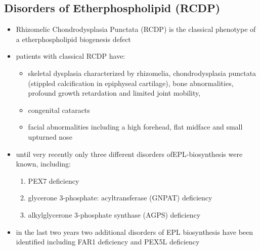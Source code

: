 \documentclass{scrartcl}
\begin{document}
\subsection{Disorders of Etherphospholipid (RCDP)}
\label{sec:orgdab7c38}
\begin{itemize}
\item Rhizomelic Chondrodysplasia Punctata (RCDP) is the classical
phenotype of a etherphospholipid biogenesis defect

\item patients with classical RCDP have:
\begin{itemize}
\item skeletal dysplasia characterized by rhizomelia, chondrodysplasia punctata (stippled calcification in epiphyseal cartilage), bone abnormalities, profound growth retardation and limited joint mobility,
\item congenital cataracts
\item facial abnormalities including a high forehead, flat midface and small upturned nose
\end{itemize}
\item until very recently only three different disorders ofEPL-biosynthesis were known, including:
\begin{enumerate}
\item PEX7 deficiency
\item glycerone 3-phosphate: acyltransferase (GNPAT) deficiency
\item alkylglycerone 3-phosphate synthase (AGPS) deficiency
\end{enumerate}

\item in the last two years two additional disorders of EPL biosynthesis have been identified including FAR1 deficiency and PEX5L deficiency
\end{itemize}
\end{document}
